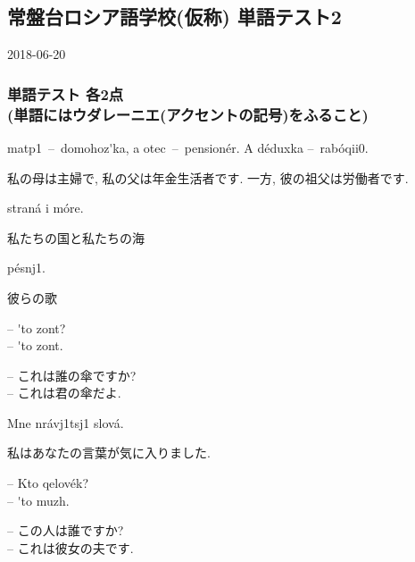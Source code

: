 \documentclass[a4j,11pt]{jsarticle}
\begin{document}
\subsection*{常盤台ロシア語学校(仮称) 単語テスト2}
\begin{flushright}
  2018-06-20
\end{flushright}
\subsubsection*{単語テスト 各2点\\(単語にはウダレーニエ(アクセントの記号)をふること)}
\begin{multicolpar}{2}
\underline{\phantom{Моя}} mat{p1}\ \---\ domohoz\'ka, a \underline{\phantom{мой}} otec\ \---\ pension\'er. A \underline{\phantom{его}} d\'eduxka \---\ rab\'oqi{i0}.

私の母は主婦で, 私の父は年金生活者です. 一方, 彼の祖父は労働者です.\\
\end{multicolpar}
\begin{multicolpar}{2}
\underline{\phantom{Наша}} stran\'a i \underline{\phantom{наше}} m\'ore.

私たちの国と私たちの海
\end{multicolpar}
\begin{multicolpar}{2}
\underline{\phantom{Их}} p\'esn{j1}.

彼らの歌
\end{multicolpar}
\begin{multicolpar}{2}
\--- \underline{\phantom{Чей}} \'\cyrerev to zont?\\
\--- \'\CYREREV to \underline{\phantom{твой}} zont.

\noindent
\--- これは誰の傘ですか?\\
\--- これは君の傘だよ.\\
\end{multicolpar}
\begin{multicolpar}{2}
Mne nr\'av{j1}{t}s{j1} \underline{\phantom{ваши}} slov\'a.

私はあなたの言葉が気に入りました.
\end{multicolpar}
\begin{multicolpar}{2}
\--- Kto \underline{\phantom{этот}} qelov\'ek?\\
\--- \'\CYREREV to \underline{\phantom{её}} mu{zh}.

\noindent
\--- この人は誰ですか?\\
\--- これは彼女の夫です.
\end{multicolpar}
\end{document}
